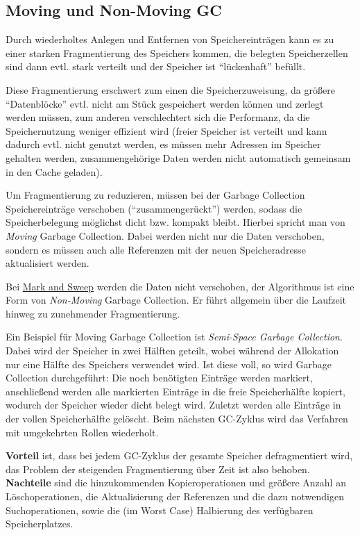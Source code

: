 \documentclass[]{article}
\begin{document}
\hypertarget{moving-und-non-moving-gc}{%
\subsection{Moving und Non-Moving GC}\label{moving-und-non-moving-gc}}

Durch wiederholtes Anlegen und Entfernen von Speichereinträgen kann es
zu einer starken Fragmentierung des Speichers kommen, die belegten
Speicherzellen sind dann evtl. stark verteilt und der Speicher ist
``lückenhaft'' befüllt.

Diese Fragmentierung erschwert zum einen die Speicherzuweisung, da
größere ``Datenblöcke'' evtl. nicht am Stück gespeichert werden können
und zerlegt werden müssen, zum anderen verschlechtert sich die
Performanz, da die Speichernutzung weniger effizient wird (freier
Speicher ist verteilt und kann dadurch evtl. nicht genutzt werden, es
müssen mehr Adressen im Speicher gehalten werden, zusammengehörige Daten
werden nicht automatisch gemeinsam in den Cache geladen).

Um Fragmentierung zu reduzieren, müssen bei der Garbage Collection
Speichereinträge verschoben (``zusammengerückt'') werden, sodass die
Speicherbelegung möglichst dicht bzw. kompakt bleibt. Hierbei spricht
man von \emph{Moving} Garbage Collection. Dabei werden nicht nur die
Daten verschoben, sondern es müssen auch alle Referenzen mit der neuen
Speicheradresse aktualisiert werden.

Bei \protect\hyperlink{mark-and-sweep}{Mark and Sweep} werden die Daten
nicht verschoben, der Algorithmus ist eine Form von \emph{Non-Moving}
Garbage Collection. Er führt allgemein über die Laufzeit hinweg zu
zunehmender Fragmentierung.

Ein Beispiel für Moving Garbage Collection ist \emph{Semi-Space Garbage
Collection}. Dabei wird der Speicher in zwei Hälften geteilt, wobei
während der Allokation nur eine Hälfte des Speichers verwendet wird. Ist
diese voll, so wird Garbage Collection durchgeführt: Die noch benötigten
Einträge werden markiert, anschließend werden alle markierten Einträge
in die freie Speicherhälfte kopiert, wodurch der Speicher wieder dicht
belegt wird. Zuletzt werden alle Einträge in der vollen Speicherhälfte
gelöscht. Beim nächsten GC-Zyklus wird das Verfahren mit umgekehrten
Rollen wiederholt.

\textbf{Vorteil} ist, dass bei jedem GC-Zyklus der gesamte Speicher
defragmentiert wird, das Problem der steigenden Fragmentierung über Zeit
ist also behoben. \textbf{Nachteile} sind die hinzukommenden
Kopieroperationen und größere Anzahl an Löschoperationen, die
Aktualisierung der Referenzen und die dazu notwendigen Suchoperationen,
sowie die (im Worst Case) Halbierung des verfügbaren Speicherplatzes.
\end{document}
